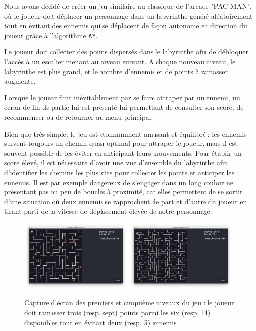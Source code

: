 \documentclass[12pt]{scrreprt} %
\begin{document}
Nous avons décidé de créer un jeu similaire au classique de l'arcade "PAC-MAN", où le joueur doit déplacer un personnage dans un labyrinthe généré aléatoirement tout en évitant des ennemis qui se déplacent de façon autonome en direction du joueur grâce à l'algorithme \texttt{A*}.




Le joueur doit collecter des points dispersés dans le labyrinthe afin de débloquer l'accès à un escalier menant au niveau suivant. A chaque nouveau niveau, le labyrinthe est plus grand, et le nombre d'ennemis et de points à ramasser augmente.

Lorsque le joueur finit inévitablement par se faire attraper par un ennemi, un écran de fin de partie lui est présenté lui permettant de consulter son score, de recommencer ou de retourner au menu principal.

Bien que très simple, le jeu est étonnamment amusant et équilibré : les ennemis suivent toujours un chemin quasi-optimal pour attraper le joueur, mais il est souvent possible de les éviter en anticipant leurs mouvements. Pour établir un score élevé, il est nécessaire d'avoir une vue d'ensemble du labyrinthe afin d'identifier les chemins les plus sûrs pour collecter les points et anticiper les ennemis. Il est par exemple dangereux de s'engager dans un long couloir ne présentant pas ou peu de boucles à proximité, car elles permettent de se sortir d'une situation où deux ennemis se rapprochent de part et d'autre du joueur en tirant parti de la vitesse de déplacement élevée de notre personnage.

\begin{figure}[h]
    \centering
    \includegraphics[width=0.49\textwidth]{images/gamelevel0.png}
    \includegraphics[width=0.49\textwidth]{images/gamelevel4.png}

    \caption{Capture d'écran des premiers et cinquième niveaux du jeu : le joueur doit ramasser trois (resp. sept) points parmi les six (resp. 14) disponibles tout en évitant deux (resp. 5) ennemis}
\end{figure}
\end{document}
